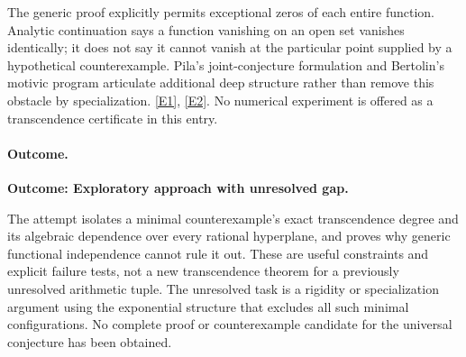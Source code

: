 \documentclass[11pt,a4paper]{article}
\newcommand{\eref}[2]{\hyperlink{extra:#1:#2}{[E#2]}}
\numberwithin{equation}{section}
\begin{document}
The generic proof explicitly permits exceptional zeros of each entire
function. Analytic continuation says a function vanishing on an open set
vanishes identically; it does not say it cannot vanish at the particular
point supplied by a hypothetical counterexample. Pila's joint-conjecture
formulation and Bertolin's motivic program articulate additional deep
structure rather than remove this obstacle by specialization.
\eref{statement}{1}, \eref{statement}{2}. No numerical experiment is offered as a
transcendence certificate in this entry.

\paragraph{Outcome.}
\textbf{Outcome: Exploratory approach with unresolved gap.}

The attempt isolates a minimal counterexample's exact transcendence degree
and its algebraic dependence over every rational hyperplane, and proves
why generic functional independence cannot rule it out. These are useful
constraints and explicit failure tests, not a new transcendence theorem
for a previously unresolved arithmetic tuple. The unresolved task is a
rigidity or specialization argument using the exponential structure that
excludes all such minimal configurations. No complete proof or
counterexample candidate for the universal conjecture has been obtained.

\end{document}
